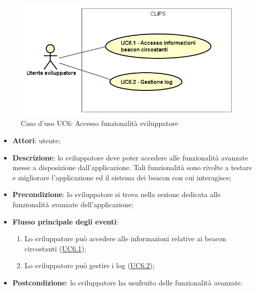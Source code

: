 \documentclass[../AnalisiDeiRequisiti.tex]{subfiles}
\begin{document}
        \begin{figure}[!h]
            \centering
            \includegraphics[scale=0.95, width=\textwidth]{img/UC6.png}
            \caption{Caso d'uso UC6: Accesso funzionalità sviluppatore}\label{fig:UC6} 
        \end{figure}
\begin{itemize}
\item \textbf{Attori}: utente;
\item \textbf{Descrizione}: lo sviluppatore deve poter accedere alle funzionalità avanzate messe a disposizione dall'applicazione. Tali funzionalità sono rivolte a testare e migliorare l'applicazione ed il sistema dei beacon con cui interagisce; 
      \item \textbf{Precondizione}: lo sviluppatore si trova nella sezione dedicata alle funzionalità avanzate dell'applicazione;

        \item \textbf{Flusso principale degli eventi}:
          \begin{enumerate}
          \item Lo sviluppatore può accedere alle informazioni relative ai beacon circostanti (\hyperlink{UC6.1}{UC6.1});
          \item Lo sviluppatore può gestire i log (\hyperlink{UC6.2}{UC6.2});

      \end{enumerate}
    \item \textbf{Postcondizione}: lo sviluppatore ha usufruito delle funzionalità avanzate.
  \end{itemize}
\hypertarget{UC6.1}{}
\end{document}
